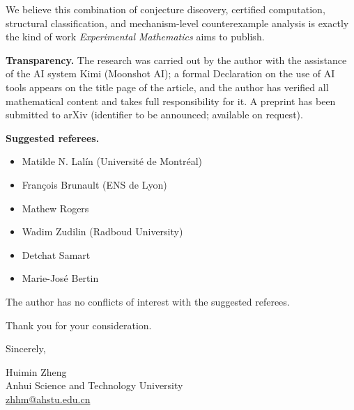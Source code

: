 \documentclass[11pt]{article}
\begin{document}
We believe this combination of conjecture discovery, certified
computation, structural classification, and mechanism-level
counterexample analysis is exactly the kind of work
\emph{Experimental Mathematics} aims to publish.

\textbf{Transparency.} The research was carried out by the author with
the assistance of the AI system Kimi (Moonshot AI); a formal
Declaration on the use of AI tools appears on the title page of the
article, and the author has verified all mathematical content and
takes full responsibility for it. A preprint has been submitted to
arXiv (identifier to be announced; available on request).

\textbf{Suggested referees.}
\begin{itemize}
\item Matilde N. Lal\'in (Universit\'e de Montr\'eal)
\item Fran\c{c}ois Brunault (ENS de Lyon)
\item Mathew Rogers
\item Wadim Zudilin (Radboud University)
\item Detchat Samart
\item Marie-Jos\'e Bertin
\end{itemize}
The author has no conflicts of interest with the suggested referees.

Thank you for your consideration.

\vspace{2em}
Sincerely,

Huimin Zheng\\
Anhui Science and Technology University\\
\url{zhhm@ahstu.edu.cn}
\end{document}

